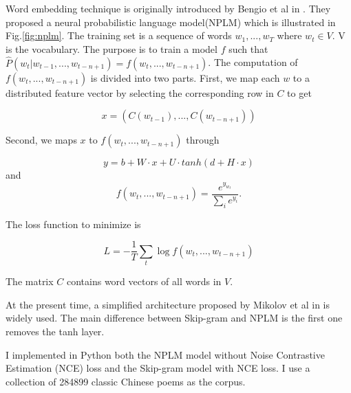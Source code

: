 \documentclass[12pt]{article}
\begin{document}
Word embedding technique is originally introduced by Bengio et al in \cite{bengio2003neural}. They proposed a neural probabilistic language model(NPLM) which is illustrated in Fig.\ref{fig:nplm}. The training set is a sequence of words $w_1,...,w_T$ where $w_t \in V$. V is the vocabulary. The purpose is to train a model $f$ such that $ \hat{P}(w_t | w_{t-1},...,w_{t-n+1}) = f(w_t, ..., w_{t-n+1})$. The computation of $f(w_t, ..., w_{t-n+1})$ is divided into two parts.
First, we map each $w$ to a distributed feature vector by selecting the corresponding row in $C$ to get

$$x=(C(w_{t-1}),... ,C(w_{t-n+1}))$$

Second, we maps $x$ to $f(w_t, ..., w_{t-n+1})$ through


$$y=b+W\cdot x + U\cdot tanh(d + H\cdot x)$$
and
$$ f(w_t, ..., w_{t-n+1}) = \frac{e^{y_{w_t}}}{\sum_{i}^{}e^{y_i}}.$$

The loss function to minimize is

$$L = -\frac{1}{T}\sum _{t}^{} \log{f(w_t, ..., w_{t-n+1})}$$


The matrix $C$ contains word vectors of all words in $V$.

At the present time, a simplified architecture proposed by Mikolov et al in \cite{mikolov2013efficient} is widely used. The main difference between Skip-gram and NPLM is the first one removes the tanh layer.

I implemented in Python both the NPLM model without Noise Contrastive Estimation (NCE) loss and the Skip-gram model with NCE loss. I use a collection of 284899 classic Chinese poems as the corpus.
\end{document}

